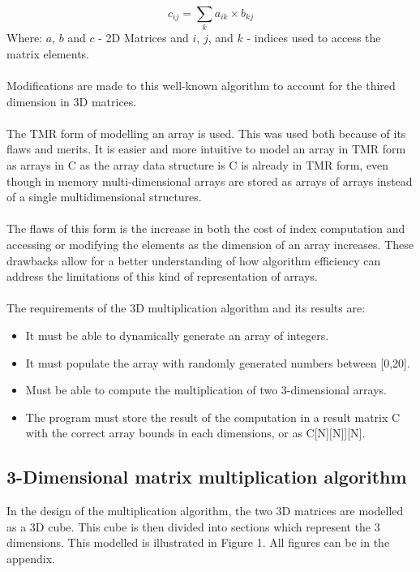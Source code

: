 \documentclass[a4paper, 11pt, onecolumn, conference]{IEEEtran}      %
\begin{document}
\begin{equation}
    c_{ij} = \sum_{k} a_{ik} \times b_{kj}  
\end{equation}
Where: $a$, $b$ and $c$ - 2D Matrices and $i$, $j$, and $k$ - indices used to access the matrix elements. 
\\\\
Modifications are made to this well-known algorithm to account for the thired dimension in 3D matrices. \\\\
The TMR form of modelling an array is used. This was used both because of its flaws and merits. It is easier and more intuitive to model an array in TMR form as arrays in C as the array data structure is C is already in TMR form, even though in memory multi-dimensional arrays are stored as arrays of arrays instead of a single multidimensional structures.\\\\
The flaws of this form is the increase in both the cost of index computation and accessing or modifying the elements as the dimension of an array increases. These drawbacks allow for a better understanding of how algorithm efficiency can address the limitations of this kind of representation of arrays. \\\\
The requirements of the 3D multiplication algorithm and its results are:

\begin{itemize}
    \item It must be able to dynamically generate an array of integers.
    \item It must populate the array with randomly generated numbers between [0,20].
    \item Must be able to compute the multiplication of two 3-dimensional arrays.
    \item The program must store the result of the computation in a result matrix C with the correct array bounds in each dimensions, or as C[N][N]][N].
\end{itemize}

\subsection{3-Dimensional matrix multiplication algorithm}
In the design of the multiplication algorithm, the two 3D matrices are modelled as a 3D cube. This cube is then divided into sections which represent the 3 dimensions. This modelled is illustrated in Figure 1. All figures can be in the appendix.
\end{document}
